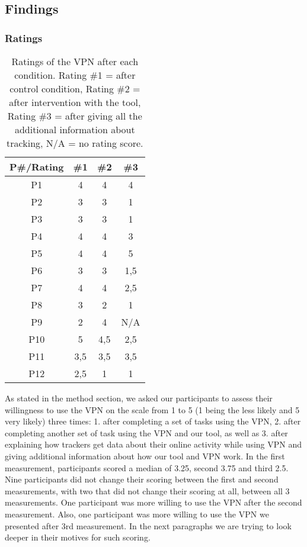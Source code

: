 \subsection{Findings}\label{sec:results}



\subsubsection{Ratings}

\begin{table}[h!]
\centering
\begin{tabular}{|c c c c|} 
 \hline
P\#/Rating & \#1 & \#2 & \#3 \\
\hline
P1 & 4 & 4 & 4\\
P2 & 3 & 3 & 1\\
P3 & 3 & 3 & 1\\
P4 & 4 & 4 & 3\\
P5 & 4 & 4 & 5\\
P6 & 3 & 3 & 1,5\\
P7 & 4 & 4 & 2,5\\
P8 & 3 & 2 & 1\\
P9 & 2 & 4 & N/A\\
P10 & 5 & 4,5 & 2,5\\
P11 & 3,5 & 3,5 & 3,5\\
P12 & 2,5 & 1 & 1 \\
 \hline
\end{tabular}
\caption{Ratings of the VPN after each condition. Rating \#1 = after control condition, Rating \#2 = after intervention with the tool, Rating \#3 = after giving all the additional information about tracking, N/A = no rating score.}
\label{table:2}
\end{table}
As stated in the method section, we asked our participants to assess their
willingness to use the VPN on the scale from 1 to 5 (1 being the less likely
and 5 very likely) three times: 1.	after completing a set of tasks using the
VPN, 2.	after completing another set of task using the VPN and our tool, as
well as 3.	after explaining how trackers get data about their online activity
while using VPN and giving additional information about  how our tool and VPN
work.  In the first measurement, participants scored a median of 3.25, second
3.75 and third 2.5. Nine participants did not change their scoring between the
first and second measurements, with two that did not change their scoring at
all, between all 3 measurements. One participant was more willing to use the
VPN after the second measurement. Also, one participant was more willing to
use the VPN we presented after 3rd measurement.  In the next paragraphs we are
trying to look deeper in their motives for such scoring.  
    


